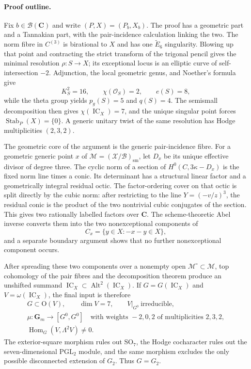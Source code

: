 \documentclass[10pt]{amsart}
\numberwithin{equation}{section}
\theoremstyle{definition}
\theoremstyle{remark}
\newcommand{\CC}{\mathbf C}
\newcommand{\GGm}{\mathbf G_m}
\newcommand{\IC}{\operatorname{IC}}
\newcommand{\Alt}{\operatorname{Alt}}
\newcommand{\Stab}{\operatorname{Stab}}
\newcommand{\cM}{\mathcal M}
\newcommand{\cB}{\mathcal B}
\newcommand{\cX}{\mathcal X}
\newcommand{\wt}{\widetilde}
\begin{document}
\paragraph{Proof outline.}
Fix $b\in\cB(\CC)$ and write $(P,X)=(P_b,X_b)$.  The proof has a geometric
part and a Tannakian part, with the pair-incidence calculation linking the
two.  The norm fibre in $C^{(3)}$ is birational to $X$ and has one
$\wt E_6$ singularity.  Blowing up that point and contracting the strict
transform of the trigonal pencil gives the minimal resolution
$\rho:S\to X$; its exceptional locus is an elliptic curve of
self-intersection $-2$.  Adjunction, the local geometric genus, and Noether's
formula give
\[
 K_S^2=16,\qquad \chi(\mathcal O_S)=2,\qquad e(S)=8,
\]
while the theta group yields $p_g(S)=5$ and $q(S)=4$.  The semismall
decomposition then gives $\chi(\IC_X)=7$, and the unique singular point
forces $\Stab_P(X)=\{0\}$.  A generic unitary twist of the same resolution
has Hodge multiplicities $(2,3,2)$.

The geometric core of the argument is the generic pair-incidence fibre.
For a geometric generic point $x$ of
$\cM=(\cX/\cB)_{\mathrm{sm}}$, let $D_x$ be its unique effective divisor of
degree three.  The cyclic norm of a section of $H^0(C,3\kappa-D_x)$ is the
fixed norm line times a conic.  Its determinant has a structural linear
factor and a geometrically integral residual octic.  The factor-ordering
cover on that octic is split directly by the cubic norm: after restricting
to the line $Y=(-v/z)^3$, the residual conic is the product of the two
nontrivial cubic conjugates of the section.  This gives two rationally
labelled factors over $\CC$.  The scheme-theoretic Abel inverse converts
them into the two nonexceptional components of
\[
 C_x=\{y\in X:-x-y\in X\},
\]
and a separate boundary argument shows that no further nonexceptional
component occurs.

After spreading these two components over a nonempty open
$\cM^\circ\subset\cM$, top cohomology of the pair fibres and the
decomposition theorem produce an unshifted summand
$\IC_X\subset\Alt^2(\IC_X)$.  If $G=G(\IC_X)$ and
$V=\omega(\IC_X)$, the final input is therefore
\[
 \begin{gathered}
 G\subset \mathrm{O}(V),\qquad \dim V=7,\qquad V|_{G^0}\ \text{irreducible},\\
 \mu:\GGm\longrightarrow [G^0,G^0]
 \quad\text{with weights }-2,0,2\text{ of multiplicities }2,3,2,\\
 \operatorname{Hom}_G(V,\Lambda^2V)\ne0.
 \end{gathered}
\]
The exterior-square morphism rules out $\mathrm{SO}_7$, the Hodge cocharacter rules
out the seven-dimensional $\mathrm{PGL}_2$ module, and the same morphism excludes the
only possible disconnected extension of $G_2$.  Thus $G=G_2$.
\end{document}
